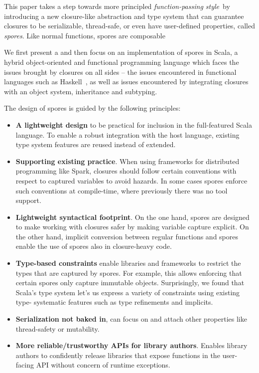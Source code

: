 \documentclass{llncs}
\begin{document}

This paper takes a step towards more principled {\em function-passing
style}~by
introducing a new closure-like abstraction and type system that can guarantee
closures to be serializable, thread-safe, or even have user-defined
properties, called {\em spores}. Like normal functions, spores are composable

We first present a and then focus on an implementation of spores in Scala, a
hybrid object-oriented and functional programming language which faces the
issues brought by closures on all sides -- the issues encountered in
functional languages such as Haskell~\cite{CloudHaskell}, as well as issues
encountered by integrating closures with an object system, inheritance and
subtyping.

The design of spores is guided by the following principles:
\begin{itemize}
\item {\bf A lightweight design} to be practical for inclusion in the 
full-featured Scala language. To enable a robust integration with the host
language, existing type system features are reused instead of extended.

\item {\bf Supporting existing practice}. When using frameworks for distributed
programming like Spark, closures should follow certain conventions with
respect to captured variables to avoid hazards. In some cases spores enforce
such conventions at compile-time, where previously there was no tool support.

\item {\bf Lightweight syntactical footprint}. On the one hand, spores are designed to
make working with closures safer by making variable capture explicit. On the
other hand, implicit conversion between regular functions and spores enable
the use of spores also in closure-heavy code.

\item {\bf Type-based constraints} enable libraries and frameworks to restrict the types
that are captured by spores. For example, this allows enforcing that certain
spores only capture immutable objects. Surprisingly, we found that Scala's
type system let's us express a variety of constraints using existing type-
systematic features such as type refinements and implicits.

\item {\bf Serialization not baked in}, can focus on and attach other properties
like thread-safety or mutability.

\item {\bf More reliable/trustworthy APIs for library authors}. Enables library
authors to confidently release libraries that expose functions in the user-
facing API without concern of runtime exceptions.
\end{itemize}
\end{document}
